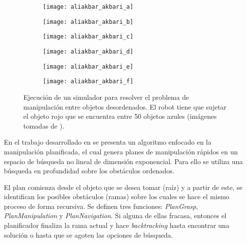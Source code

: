 \begin{figure}[H]
	\begin{subfigure}{0.3\textwidth}
		\texttt{[image: aliakbar\_akbari\_a]}%
		\subcaption{}%
	\end{subfigure}%
	\hspace{0.25cm}%
	\begin{subfigure}{0.3\textwidth}
		\texttt{[image: aliakbar\_akbari\_b]}%
		\subcaption{}%
	\end{subfigure}%
	\hspace{0.25cm}%
	\begin{subfigure}{0.3\textwidth}
		\texttt{[image: aliakbar\_akbari\_c]}%
		\subcaption{}%
		\label{subfig:Akbari2019c}%
	\end{subfigure}%
	
	\vspace{3pt}%
	\begin{subfigure}{0.3\textwidth}
		\texttt{[image: aliakbar\_akbari\_d]}%
		\subcaption{}%
	\end{subfigure}%
	\hspace{0.25cm}%
	\begin{subfigure}{0.3\textwidth}
		\texttt{[image: aliakbar\_akbari\_e]}%
		\subcaption{}%
		\label{subfig:Akbari2019e}%
	\end{subfigure}%
	\hspace{0.25cm}%
	\begin{subfigure}{0.3\textwidth}
		\texttt{[image: aliakbar\_akbari\_f]}%
		\subcaption{}%
	\end{subfigure}%
	\caption{Ejecución de un simulador para resolver el problema de manipulación entre objetos desordenados. El robot tiene que sujetar el objeto rojo que se encuentra entre 50 objetos azules (imágenes tomadas de \cite{Akbari2019}).}%
	\label{fig:Akbari2019}%
\end{figure}
%
En el trabajo desarrollado en \cite{4209604} se presenta un algoritmo enfocado en la manipulación planificada, el cual genera planes de manipulación rápidos en un espacio de búsqueda no lineal de dimensión exponencial. 
Para ello se utiliza una búsqueda en profundidad sobre los obstáculos ordenados. 

El plan comienza desde el objeto que se desea tomar (raíz) y a partir de este, se identifican los posibles obstáculos (ramas) sobre los cuales se hace el mismo proceso de forma recursiva.
Se definen tres funciones: \textit{PlanGrasp}, \textit{PlanManipulation} y \textit{PlanNavigation}. 
Si alguna de ellas fracasa, entonces el planificador finaliza la rama actual y hace \textit{backtracking} hasta encontrar una solución o hasta que se agoten las opciones de búsqueda.

